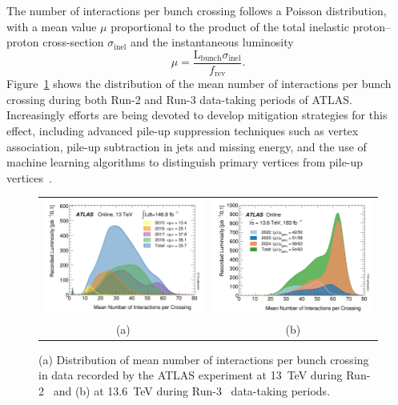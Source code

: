 The number of interactions per bunch crossing follows a Poisson distribution, with a mean value $\mu$ proportional to the product of the total inelastic proton--proton cross-section $\sigma_{\text{inel}}$ and the instantaneous luminosity~\cite{pileup}
\begin{equation}
    \mu = \frac{\text{L}_{\text{bunch}}\sigma_{\text{inel}}}{f_{\text{rev}}}.
\end{equation}
Figure~\ref{fig:pileup} shows the distribution of the mean number of interactions per bunch crossing during both Run-2 and Run-3 data-taking periods of ATLAS.
Increasingly efforts are being devoted to develop mitigation strategies for this effect, including advanced pile-up suppression techniques such as vertex association, pile-up subtraction in jets and missing energy, and the use of machine learning algorithms to distinguish primary vertices from pile-up vertices~\cite{ATL-PHYS-PUB-2023-011,ATLAS:2017pfq,Soyez_2019}.
\begin{figure}[htbp]
    \centering
    \begin{tabular}{cc}
        \includegraphics[width=0.5\linewidth]{images/mu_2015_2018.png} &
        \includegraphics[width=0.5\linewidth]{images/mu_2022_2024.png} \\
        (a) & (b)  \\
    \end{tabular}
    \caption{(a) Distribution of mean number of interactions per bunch crossing in data recorded by the ATLAS experiment at 13~TeV during Run-2~\cite{atlas:Run2lumi} and  (b) at 13.6~TeV during Run-3~\cite{atlas:Run2lumi} data-taking periods.}
    \label{fig:pileup}
    \end{figure}
